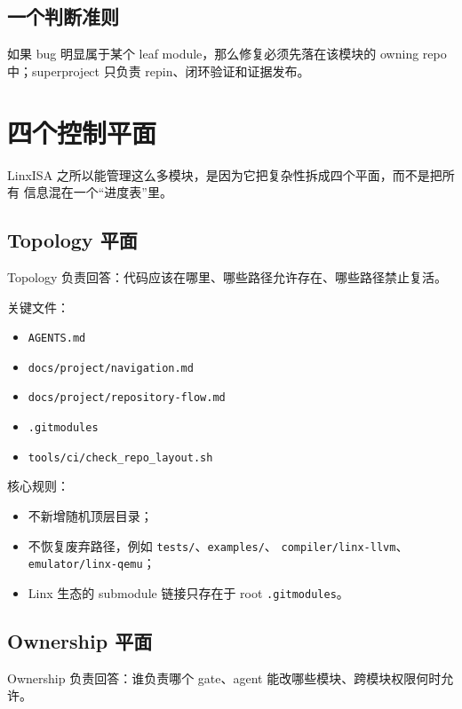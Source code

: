 \documentclass[UTF8,11pt,a4paper]{ctexart}
\begin{document}
\subsection{一个判断准则}

如果 bug 明显属于某个 leaf module，那么修复必须先落在该模块的 owning repo
中；superproject 只负责 repin、闭环验证和证据发布。

\section{四个控制平面}

LinxISA 之所以能管理这么多模块，是因为它把复杂性拆成四个平面，而不是把所有
信息混在一个“进度表”里。

\subsection{Topology 平面}

Topology 负责回答：代码应该在哪里、哪些路径允许存在、哪些路径禁止复活。

关键文件：

\begin{itemize}
  \item \texttt{AGENTS.md}
  \item \texttt{docs/project/navigation.md}
  \item \texttt{docs/project/repository-flow.md}
  \item \texttt{.gitmodules}
  \item \texttt{tools/ci/check\_repo\_layout.sh}
\end{itemize}

核心规则：

\begin{itemize}
  \item 不新增随机顶层目录；
  \item 不恢复废弃路径，例如 \texttt{tests/}、\texttt{examples/}、
  \texttt{compiler/linx-llvm}、\texttt{emulator/linx-qemu}；
  \item Linx 生态的 submodule 链接只存在于 root \texttt{.gitmodules}。
\end{itemize}

\subsection{Ownership 平面}

Ownership 负责回答：谁负责哪个 gate、agent 能改哪些模块、跨模块权限何时允许。
\end{document}
